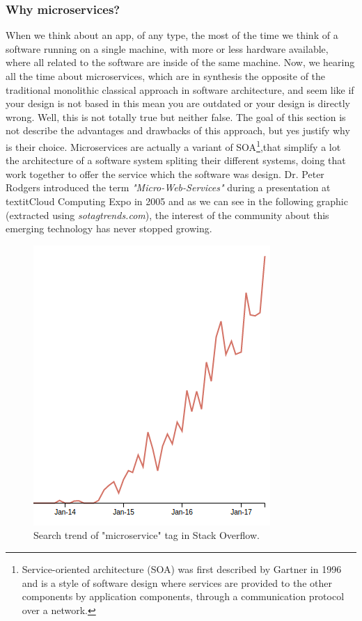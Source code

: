 \subsubsection{Why microservices?}

When we think about an app, of any type, the most of the time we think of a software
running on a single machine, with more or less hardware available, where all
related to the software are inside of the same machine.
\intro
Now, we hearing all the time about microservices, which are in synthesis the
opposite of the traditional monolithic classical approach in software architecture,
and seem like if your design is not based in this mean you are outdated or your design is directly wrong.
Well, this is not totally true but neither false. The goal of this section is
not describe the advantages and drawbacks of this approach, but yes justify why
is their choice.
\intro
Microservices are actually a variant of SOA\footnote{Service-oriented architecture (SOA)
was first described by Gartner in 1996 and is a style of software design where
services are provided to the other components by application components, through
a communication protocol over a network.},that simplify a lot the architecture
of a software system spliting their different systems, doing that work together
to offer the service which the software was design.
Dr. Peter Rodgers introduced the term \textit{"Micro-Web-Services"} during a presentation
at textit{Cloud Computing Expo} in 2005 and as we can see in the following graphic (extracted
using \textit{sotagtrends.com}), the interest of the community about this emerging technology
has never stopped growing.

\begin{figure}[H]
  \includegraphics[scale=0.5]{img/graphics/microservices_trend.png}
  \centering
  \caption{Search trend of "microservice" tag in Stack Overflow.}
\end{figure}

